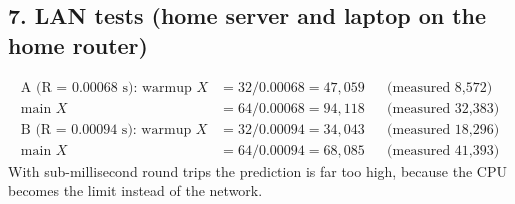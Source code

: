 \documentclass[10pt]{article}
\begin{document}
{\subsection*{7. LAN tests (home server and laptop on the home router)}
\begin{align*}
\text{A (R = 0.00068 s): warmup } X &= 32 / 0.00068 = 47{,}059 &&\text{(measured 8,572)}\\
\text{main } X &= 64 / 0.00068 = 94{,}118 &&\text{(measured 32,383)}\\
\text{B (R = 0.00094 s): warmup } X &= 32 / 0.00094 = 34{,}043 &&\text{(measured 18,296)}\\
\text{main } X &= 64 / 0.00094 = 68{,}085 &&\text{(measured 41,393)}
\end{align*}
With sub-millisecond round trips the prediction is far too high, because the CPU becomes the limit instead of the network.
}
\end{document}
